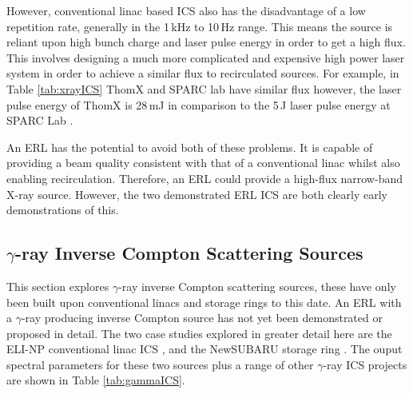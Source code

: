 \documentclass[11pt]{article}
\begin{document}
However, conventional linac based ICS also has the disadvantage of a low repetition rate, generally in the 1\,kHz to 10\,Hz range. This means the source is reliant upon high bunch charge and laser pulse energy in order to get a high flux. This involves designing a much more complicated and expensive high power laser system in order to achieve a similar flux to recirculated sources. For example, in Table \ref{tab:xrayICS} ThomX and SPARC lab have similar flux however, the laser pulse energy of ThomX is 28\,mJ \cite{ThomXTDR} in comparison to the 5\,J laser pulse energy at SPARC Lab \cite{SPARCcom}.

An ERL has the potential to avoid both of these problems. It is capable of providing a beam quality consistent with that of a conventional linac whilst also enabling recirculation. Therefore, an ERL could provide a high-flux narrow-band X-ray source. However, the two demonstrated ERL ICS are both clearly early demonstrations of this. 


\subsection{$\gamma$-ray Inverse Compton Scattering Sources}
\label{sec:grayicscomp}

This section explores $\gamma$-ray inverse Compton scattering sources, these have only been built upon conventional linacs and storage rings to this date. An ERL with a $\gamma$-ray producing inverse Compton source has not yet been demonstrated or proposed in detail.  The two case studies explored in greater detail here are the ELI-NP conventional linac ICS \cite{ELINPwp}, and the NewSUBARU storage ring \cite{NewSUBARU}. The ouput spectral parameters for these two sources plus a range of other $\gamma$-ray ICS projects are shown in Table \ref{tab:gammaICS}.	
\end{document}
